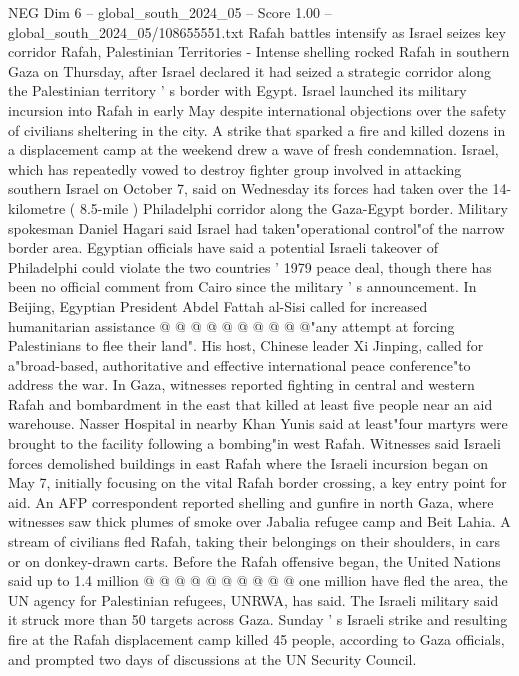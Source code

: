 \begin{textsample}{NEG Dim 6 – global\_south\_2024\_05 – Score 1.00 – global\_south\_2024\_05/108655551.txt}  \label{ex:f6_neg_287}
Rafah battles intensify as Israel seizes key corridor Rafah, Palestinian Territories - Intense shelling rocked Rafah in southern Gaza on Thursday, after Israel declared it had seized a strategic corridor along the Palestinian territory ' s border with Egypt.
Israel launched its military incursion into Rafah in early May despite international objections over the safety of civilians sheltering in the city.
A strike that sparked a fire and killed dozens in a displacement camp at the weekend drew a wave of fresh condemnation.
Israel, which has repeatedly vowed to destroy fighter group involved in attacking southern Israel on October 7, said on Wednesday its forces had taken over the 14-kilometre ( 8.5-mile ) Philadelphi corridor along the Gaza-Egypt border.
Military spokesman Daniel Hagari said Israel had taken"operational control"of the narrow border area.
Egyptian officials have said a potential Israeli takeover of Philadelphi could violate the two countries ' 1979 peace deal, though there has been no official comment from Cairo since the military ' s announcement.
In Beijing, Egyptian President Abdel Fattah al-Sisi called for increased humanitarian assistance @ @ @ @ @ @ @ @ @ @"any attempt at forcing Palestinians to flee their land".
His host, Chinese leader Xi Jinping, called for a"broad-based, authoritative and effective international peace conference"to address the war.
In Gaza, witnesses reported fighting in central and western Rafah and bombardment in the east that killed at least five people near an aid warehouse.
Nasser Hospital in nearby Khan Yunis said at least"four martyrs were brought to the facility following a bombing"in west Rafah.
Witnesses said Israeli forces demolished buildings in east Rafah where the Israeli incursion began on May 7, initially focusing on the vital Rafah border crossing, a key entry point for aid.
An AFP correspondent reported shelling and gunfire in north Gaza, where witnesses saw thick plumes of smoke over Jabalia refugee camp and Beit Lahia.
A stream of civilians fled Rafah, taking their belongings on their shoulders, in cars or on donkey-drawn carts.
Before the Rafah offensive began, the United Nations said up to 1.4 million @ @ @ @ @ @ @ @ @ @ one million have fled the area, the UN agency for Palestinian refugees, UNRWA, has said.
The Israeli military said it struck more than 50 targets across Gaza.
Sunday ' s Israeli strike and resulting fire at the Rafah displacement camp killed 45 people, according to Gaza officials, and prompted two days of discussions at the UN Security Council.

\end{textsample}
